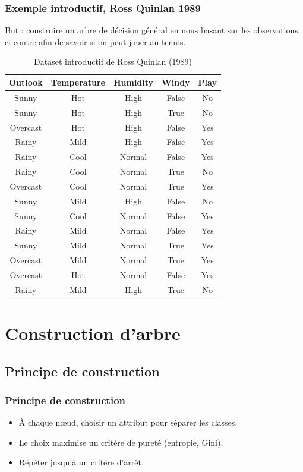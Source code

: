 \documentclass{beamer}
\begin{document}
\begin{frame}
	\frametitle{Exemple introductif, Ross Quinlan 1989}
	But : construire un arbre de décision général en nous basant sur les observations ci-contre afin de savoir si on peut jouer au tennis.
	\begin{table}[h]
	\scriptsize
    \centering
        \begin{tabular}{|c|c|c|c|c|}
        \hline
        \textbf{Outlook} & \textbf{Temperature} & \textbf{Humidity} & \textbf{Windy} & \textbf{Play} \\ \hline
        Sunny    & Hot  & High   & False & No  \\ \hline
        Sunny    & Hot  & High   & True  & No  \\ \hline
        Overcast & Hot  & High   & False & Yes \\ \hline
        Rainy    & Mild & High   & False & Yes \\ \hline
        Rainy    & Cool & Normal & False & Yes \\ \hline
        Rainy    & Cool & Normal & True  & No  \\ \hline
        Overcast & Cool & Normal & True  & Yes \\ \hline
        Sunny    & Mild & High   & False & No  \\ \hline
        Sunny    & Cool & Normal & False & Yes \\ \hline
        Rainy    & Mild & Normal & False & Yes \\ \hline
        Sunny    & Mild & Normal & True  & Yes \\ \hline
        Overcast & Mild & Normal & True  & Yes \\ \hline
        Overcast & Hot  & Normal & False & Yes \\ \hline
        Rainy    & Mild & High   & True  & No  \\ \hline
        \end{tabular}
    \caption{Dataset introductif de Ross Quinlan (1989)}
    \end{table}
\end{frame}

\section{Construction d'arbre}
\subsection{Principe de construction}
\begin{frame}
	\frametitle{Principe de construction}
	\begin{itemize}
		\item À chaque nœud, choisir un attribut pour séparer les classes.
		\item Le choix maximise un critère de pureté (entropie, Gini).
		\item Répéter jusqu'à un critère d'arrêt.
	\end{itemize}
\end{frame}
\end{document}
